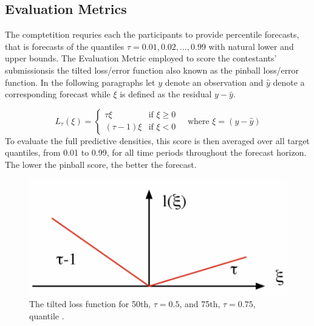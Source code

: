 \documentclass[conference]{IEEEtran}
\begin{document}
\subsection{Evaluation Metrics}
The comptetition requries each the participants to provide percentile forecasts, that is forecasts of the quantiles $\tau=0.01, 0.02, \dots, 0.99$ with natural lower and upper bounds.
The Evaluation Metric employed to score the contestants' submissionsis the tilted loss/error function also known as the pinball loss/error function. In the following paragraphs let $y$ denote an observation and $\hat{y}$ denote a corresponding forecast while $\xi$ is defined as the residual $y-\hat{y}$.\par
\[
  L_{\tau}(\xi)=\begin{cases} \tau \xi & \text{if } \xi \geq 0 \\
                                          (\tau-1)\xi & \text{if } \xi < 0 
                                  \end{cases} \quad\text{where } \xi=(y-\hat{y})
\]
To evaluate the full predictive densities, this score is then averaged over all target quantiles, from 0.01 to 0.99, for all time periods throughout the forecast horizon. The lower the pinball score, the better the forecast.

\begin{figure}[ht!]
\centering
\includegraphics[width=\linewidth]{gfx/pinball.pdf}
\caption{The tilted loss function for 50th, $\tau=0.5$, and 75th, $\tau=0.75$, quantile \cite{Takeuchi2005}.}
\label{fig:pinball}
\end{figure}
\end{document}

